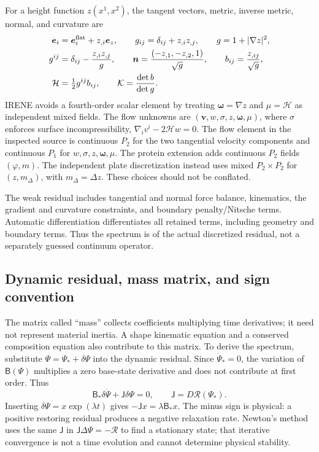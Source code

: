 For a height function $z(x^1,x^2)$, the tangent vectors, metric, inverse metric, normal, and curvature are
\begin{align}
\bm e_i&=\bm e_i^{\rm flat}+z_{,i}\bm e_z,\qquad g_{ij}=\delta_{ij}+z_{,i}z_{,j},\qquad g=1+|\nabla z|^2,\\
g^{ij}&=\delta_{ij}-\frac{z_{,i}z_{,j}}{g},\qquad
\bm n=\frac{(-z_{,1},-z_{,2},1)}{\sqrt g},\qquad
b_{ij}=\frac{z_{,ij}}{\sqrt g},\\
\mathcal H&=\tfrac12g^{ij}b_{ij},\qquad \mathcal K=\frac{\det b}{\det g}.
\end{align}
IRENE avoids a fourth-order scalar element by treating $\bm\omega=\nabla z$ and $\mu=\mathcal H$ as independent mixed fields. The flow unknowns are $(\bm v,w,\sigma,z,\bm\omega,\mu)$, where $\sigma$ enforces surface incompressibility, $\nabla_i v^i-2\mathcal H w=0$. The flow element in the inspected source is continuous $P_2$ for the two tangential velocity components and continuous $P_1$ for $w,\sigma,z,\bm\omega,\mu$. The protein extension adds continuous $P_2$ fields $(\varphi,m)$. The independent plate discretization instead uses mixed $P_2\times P_2$ for $(z,m_\Delta)$, with $m_\Delta=\Delta z$. These choices should not be conflated.

The weak residual includes tangential and normal force balance, kinematics, the gradient and curvature constraints, and boundary penalty/Nitsche terms. Automatic differentiation differentiates all retained terms, including geometry and boundary terms. Thus the spectrum is of the actual discretized residual, not a separately guessed continuum operator.


\subsection{Dynamic residual, mass matrix, and sign convention}


The matrix called ``mass'' collects coefficients multiplying time derivatives; it need not represent material inertia. A shape kinematic equation and a conserved composition equation also contribute to this matrix. To derive the spectrum, substitute $\Psi=\Psi_*+\delta\Psi$ into the dynamic residual. Since $\dot\Psi_*=0$, the variation of $\mathsf B(\Psi)$ multiplies a zero base-state derivative and does not contribute at first order. Thus
\begin{equation}
\mathsf B_*\delta\dot\Psi+\mathsf J\delta\Psi=0,
\qquad \mathsf J=D\mathcal R(\Psi_*).
\end{equation}
Inserting $\delta\Psi=x\exp(\lambda t)$ gives $-\mathsf Jx=\lambda\mathsf B_*x$. The minus sign is physical: a positive restoring residual produces a negative relaxation rate. Newton's method uses the same $\mathsf J$ in $\mathsf J\Delta\Psi=-\mathcal R$ to find a stationary state; that iterative convergence is not a time evolution and cannot determine physical stability.

